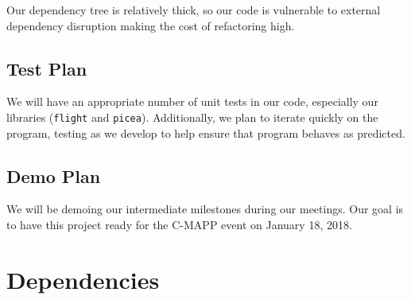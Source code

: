 \documentclass[titlepage,12pt]{article}
\begin{document}
Our dependency tree is relatively thick, so our code is vulnerable to external
dependency disruption making the cost of refactoring high.

\subsection{Test Plan}
We will have an appropriate number of unit tests in our code, especially our
libraries (\texttt{flight} and \texttt{picea}). Additionally, we plan to iterate
quickly on the program, testing as we develop to help ensure that program
behaves as predicted.

\subsection{Demo Plan}
We will be demoing our intermediate milestones during our meetings. Our goal is
to have this project ready for the C-MAPP event on January 18, 2018.

\section{Dependencies}
\end{document}
